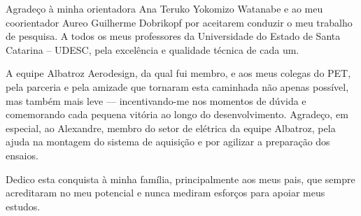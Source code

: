 \begin{agradecimentos}
Agradeço à minha orientadora Ana Teruko Yokomizo Watanabe e ao meu coorientador Aureo Guilherme Dobrikopf por aceitarem conduzir o meu trabalho de pesquisa. A todos os meus professores da Universidade do Estado de Santa Catarina – UDESC, pela excelência e qualidade técnica de cada um.

A equipe Albatroz Aerodesign, da qual fui membro, e aos meus colegas do PET, pela parceria e pela amizade que tornaram esta caminhada não apenas possível, mas também mais leve — incentivando-me nos momentos de dúvida e comemorando cada pequena vitória ao longo do desenvolvimento. Agradeço, em especial, ao Alexandre, membro do setor de elétrica da equipe Albatroz, pela ajuda na montagem do sistema de aquisição e por agilizar a preparação dos ensaios.

Dedico esta conquista à minha família, principalmente aos meus pais, que sempre acreditaram no meu potencial e nunca mediram esforços para apoiar meus estudos.
\end{agradecimentos}
